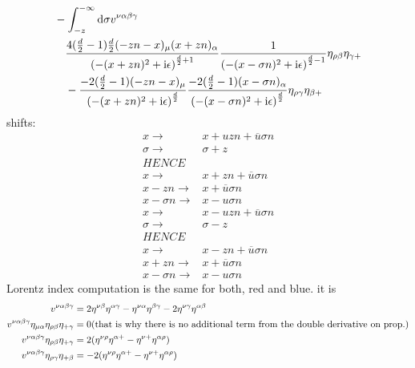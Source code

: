 {\color{red}
\begin{align}
	&-\int_{-z}^{-\infty}\text{d} \sigma v^{\nu \alpha\beta\gamma}
	\\&~~~
	\frac{4(\frac{d}{2}-1)\frac{d}{2}(-zn-x)_\mu(x+zn)_\alpha}{\left(-(x+zn)^2 + \text{i} \epsilon\right)^{\frac{d}{2}+1}} 
	\frac{1}{\left(-(x-\sigma n)^2 + \text{i} \epsilon\right)^{\frac{d}{2}-1}}\eta_{\rho \beta} \eta_{\gamma +} 
	\\&~~~
	- \frac{-2(\frac{d}{2}-1)(-zn-x)_\mu}{\left( -(x+z n)^2 + \text{i} \epsilon \right)^{\frac{d}{2}}}\frac{-2(\frac{d}{2}-1)(x-\sigma n)_\alpha}{\left(-(x-\sigma n)^2 + \text{i} \epsilon\right)^{\frac{d}{2}}}
	\eta_{\rho \gamma}\eta_{\beta +}
\end{align}
}
shifts:
{\color{blue}
\begin{align}
	x\rightarrow &x+ uzn + \overline u  \sigma n\\
	\sigma \rightarrow& \sigma +z
	\\
	HENCE\\
	x\rightarrow & x+ zn + \overline u \sigma n
	\\
	x-zn \rightarrow &  x + \overline u \sigma n
	\\
	x-\sigma n \rightarrow & x  - u \sigma n
\end{align}
}
{\color{red}
\begin{align}
	x\rightarrow &x- uzn + \overline u  \sigma n\\
	\sigma \rightarrow& \sigma -z
	\\
	HENCE\\
	x\rightarrow & x- zn + \overline u \sigma n
	\\
	x+zn \rightarrow &  x + \overline u \sigma n
	\\
	x-\sigma n \rightarrow & x - u \sigma n
\end{align}
}
Lorentz index computation is the same for both, red and blue. it is
\begin{align}
v^{\nu\alpha\beta\gamma} 
&=
2\eta^{\nu \beta}\eta^{\alpha\gamma}-\eta^{\nu \alpha}\eta^{\beta \gamma} -2\eta^{\nu \gamma} \eta^{\alpha\beta}
\\
v^{\nu\alpha\beta\gamma}\eta_{\mu\alpha}\eta_{\rho\beta}\eta_{+\gamma}
&=
0\text{(that is why there is no additional term from the double derivative on prop.)}
\\
v^{\nu\alpha\beta\gamma}\eta_{\rho\beta}\eta_{+\gamma}
&=
2(\eta^{\nu \rho} \eta^{\alpha+} - \eta^{\nu +}\eta^{\alpha\rho})
\\
v^{\nu\alpha\beta\gamma}\eta_{\rho\gamma}\eta_{+\beta}
&=
-2(\eta^{\nu \rho} \eta^{\alpha+} - \eta^{\nu +}\eta^{\alpha\rho})
\end{align}

